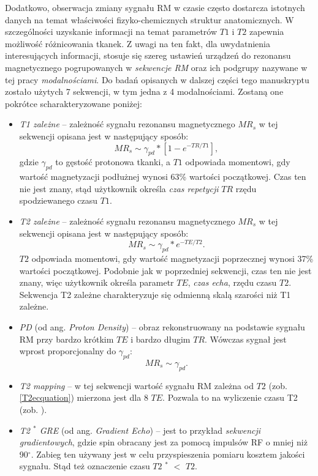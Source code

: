 Dodatkowo, obserwacja zmiany sygnału RM w czasie często dostarcza istotnych danych na temat właściwości fizyko-chemicznych struktur anatomicznych. W szczególności uzyskanie informacji na temat parametrów $T1$ i $T2$ zapewnia możliwość różnicowania tkanek. Z uwagi na ten fakt, dla uwydatnienia interesujących informacji, stosuje się szereg ustawień urządzeń do rezonansu magnetycznego pogrupowanych w \textit{sekwencje RM} oraz ich podgrupy nazywane w tej pracy \textit{modalnościami}. Do badań opisanych w dalszej części tego manuskryptu zostało użytych 7 sekwencji, w tym jedna z 4 modalnościami. Zostaną one pokrótce scharakteryzowane poniżej:
\begin{itemize}
	\item \textit{T1 zależne} -- zależność sygnału rezonansu magnetycznego $MR_s$ w tej sekwencji opisana jest w następujący sposób: 
	\begin{equation}
		MR_s \sim \gamma_{pd} \ast [1-e^{-TR/T1}],
	\end{equation}
	gdzie $\gamma_{pd}$ to gęstość protonowa tkanki, a $T1$ odpowiada momentowi, gdy wartość magnetyzacji podłużnej wynosi 63\% wartości początkowej. Czas ten nie jest znany, stąd użytkownik określa \textit{czas repetycji} $TR$ rzędu spodziewanego czasu $T1$.
	\item \textit{T2 zależne} -- zależność sygnału rezonansu magnetycznego $MR_s$ w tej sekwencji opisana jest w następujący sposób: 
	\begin{equation}
	\label{T2ecquation}
	MR_s \sim \gamma_{pd} \ast e^{-TE/T2}.
	\end{equation}
	$T2$ odpowiada momentowi, gdy wartość magnetyzacji poprzecznej wynosi 37\% wartości początkowej. Podobnie jak w poprzedniej sekwencji, czas ten nie jest znany, więc użytkownik określa parametr $TE$, \textit{czas echa}, rzędu czasu $T2$. Sekwencja T2 zależne charakteryzuje się odmienną skalą szarości niż T1 zależne.
	\item \textit{PD} (od ang. \textit{Proton Density}) -- obraz rekonstruowany na podstawie sygnału RM przy bardzo krótkim $TE$ i bardzo długim $TR$. Wówczas sygnał jest wprost proporcjonalny do $\gamma_{pd}$:
	\begin{equation}
	MR_s \sim \gamma_{pd}.
	\end{equation}
	\item \textit{T2 mapping} -- w tej sekwencji wartość sygnału RM zależna od $T2$ (zob. \ref{T2ecquation}) mierzona jest dla 8 $TE$. Pozwala to na wyliczenie czasu T2 (zob. \cite{Regulski2017}).
	\item \textit{T2 $^\ast$ GRE} (od ang. \textit{Gradient Echo}) -- jest to przykład \textit{sekwencji gradientowych}, gdzie spin obracany jest za pomocą impulsów RF o mniej niż 90$^\circ$. Zabieg ten używany jest w celu przyspieszenia pomiaru kosztem jakości sygnału. Stąd też oznaczenie czasu $T2$ $^\ast$ $<$ $T2$. 

\end{itemize}
